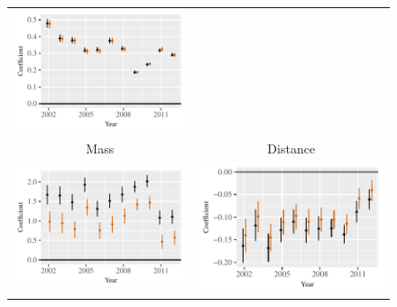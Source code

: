 \documentclass{article}
\begin{document}
\begin{figure}
\begin{tabular}{c@{\hskip -.4cm}c}
\includegraphics[height=.22\textheight, clip=true, trim=.5cm .5cm 0cm .1cm]{draft_figures/rl_plots/LDV.pdf}   \\
Mass &
Distance\\
\includegraphics[height=.22\textheight, clip=true, trim=0cm .5cm 0cm .1cm]{draft_figures/rl_plots/Mass.pdf}    & 
\includegraphics[height=.22\textheight, clip=true, trim=.5cm .5cm 0cm .1cm]{draft_figures/rl_plots/Distance.pdf}   \\

\end{tabular}
\end{figure}
\end{document}
